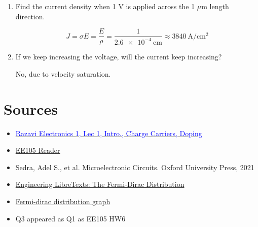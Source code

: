 \begin{enumerate}
\begin{enumerate}
            \item Find the current density when 1 V is applied across the 1 $\mu$m length direction.
            \begin{Ans}
                \[J = \sigma E = \frac{E}{\rho} = \frac{1}{\qty{2.6e-4}{\centi\meter}} \approx \qty{3840}{\ampere\per\centi\meter\squared}\]
            \end{Ans}

            \item If we keep increasing the voltage, will the current keep increasing?
            \begin{Ans}
                No, due to velocity saturation.
            \end{Ans}
        \end{enumerate}
    \end{enumerate}
\section{Sources}
\begin{itemize}
    \item \href{https://www.youtube.com/watch?v=yQDfVJzEymI}{\textcolor{blue}{Razavi Electronics 1, Lec 1, Intro., Charge Carriers, Doping}}
    \item \href{https://file.notion.so/f/f/048d6522-202b-48d4-b5d9-bc005bd602e2/214bf1f0-292f-48d6-9016-737d9f5da155/ee105_reader_v3.pdf?id=237a4300-3dbe-47d1-888b-ffae90d8352b&table=block&spaceId=048d6522-202b-48d4-b5d9-bc005bd602e2&expirationTimestamp=1714435200000&signature=yx-H1qvZJIodPfazOpwXX0Ce2mWMG8skOHl45xoPxus&downloadName=ee105_reader_v3.pdf}{EE105 Reader}
    \item Sedra, Adel S., et al. Microelectronic Circuits. Oxford University Press, 2021
    \item \href{https://eng.libretexts.org/Bookshelves/Materials_Science/TLP_Library_II/22%3A_Introduction_to_Semiconductors/22.2%3A_The_FermiDirac_Distribution}{Engineering LibreTexts: The Fermi-Dirac Distribution}
    \item \href{https://tex.stackexchange.com/questions/251496/fermi-dirac-in-pgfplots-dimension-too-lage}{Fermi-dirac distribution graph}
    \item Q3 appeared as Q1 as EE105 HW6
\end{itemize}


